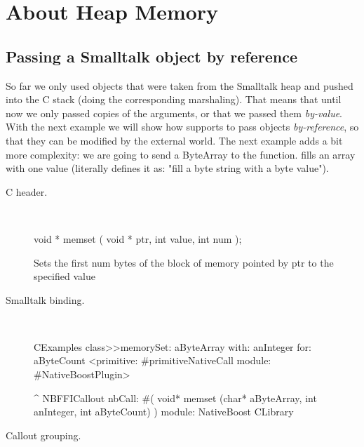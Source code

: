 \documentclass[a4paper,10pt,twoside]{book}
\begin{document}


\section{About Heap Memory}\label{sec:aboutMemory}

\subsection{Passing a Smalltalk object by reference}

So far we only used objects that were taken from the Smalltalk heap and pushed into the C stack (doing the corresponding marshaling). 
That means that until now we only passed copies of the arguments, or that we passed them \emph{by-value}. With the next example we will show how \NativeBoost supports to pass objects \emph{by-reference}, so that they can be modified by the external world.
The next example adds a bit more complexity: we are going to send a ByteArray
to the  function.  fills an array with one value (literally  defines it as: "fill a byte string with a byte value").

\begin{description}
\item [C header.] \ 

\begin{code}{}
void * memset ( void * ptr, int value, int num );
\end{code}
Sets the first num bytes of the block of memory pointed by ptr to the specified value

\item [Smalltalk binding.] \ 

\begin{code}{}
CExamples class>>memorySet: aByteArray with: anInteger for: aByteCount
	<primitive: #primitiveNativeCall module: #NativeBoostPlugin>
	
	^ NBFFICallout nbCall: #( void* memset (char* aByteArray, int anInteger, int aByteCount) ) module: NativeBoost CLibrary
\end{code}


\item [Callout grouping.] \ 
 

\end{description}
\end{document}
